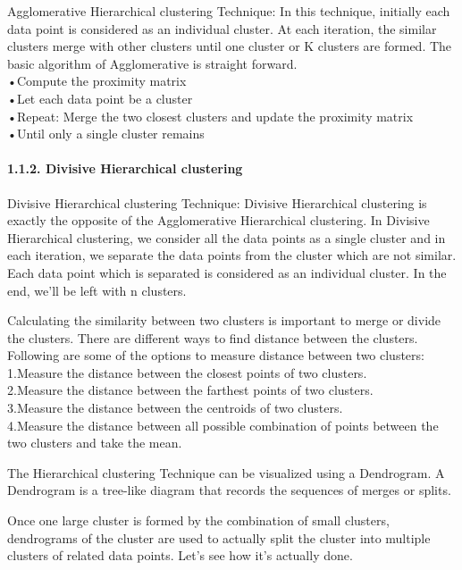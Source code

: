 \documentclass[11pt]{article}
\begin{document}
    Agglomerative Hierarchical clustering Technique: In this technique,
initially each data point is considered as an individual cluster. At
each iteration, the similar clusters merge with other clusters until one
cluster or K clusters are formed. The basic algorithm of Agglomerative
is straight forward.\\
•Compute the proximity matrix\\
•Let each data point be a cluster\\
•Repeat: Merge the two closest clusters and update the proximity
matrix\\
•Until only a single cluster remains

    \hypertarget{divisive-hierarchical-clustering}{%
\paragraph{1.1.2. Divisive Hierarchical
clustering}\label{divisive-hierarchical-clustering}}

    Divisive Hierarchical clustering Technique: Divisive Hierarchical
clustering is exactly the opposite of the Agglomerative Hierarchical
clustering. In Divisive Hierarchical clustering, we consider all the
data points as a single cluster and in each iteration, we separate the
data points from the cluster which are not similar. Each data point
which is separated is considered as an individual cluster. In the end,
we'll be left with n clusters.

    Calculating the similarity between two clusters is important to merge or
divide the clusters. There are different ways to find distance between
the clusters. Following are some of the options to measure distance
between two clusters:\\
1.Measure the distance between the closest points of two clusters.\\
2.Measure the distance between the farthest points of two clusters.\\
3.Measure the distance between the centroids of two clusters.\\
4.Measure the distance between all possible combination of points
between the two clusters and take the mean.

    The Hierarchical clustering Technique can be visualized using a
Dendrogram. A Dendrogram is a tree-like diagram that records the
sequences of merges or splits.

    Once one large cluster is formed by the combination of small clusters,
dendrograms of the cluster are used to actually split the cluster into
multiple clusters of related data points. Let's see how it's actually
done.
\end{document}
